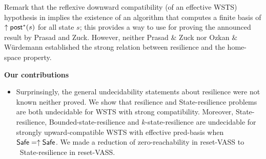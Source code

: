 Remark that the reflexive downward compatibility (of an effective WSTS) hypothesis in  \cite{DBLP:journals/corr/PrasadZ16} implies the existence of an algorithm that computes a finite basis of $\uparrow \textsf{post}^*(s)$ for all state $s$; this provides a way to use \cite{DBLP:journals/corr/abs-2108-00889} for proving the announced result by Prasad and Zuck.
However, neither Prasad \& Zuck nor Ozkan \& Würdemann established the strong relation between resilience and the home-space property.
%






\noindent
{\bf Our contributions}
\begin{itemize}

\item Surprinsingly, the general undecidability statements about resilience were not known neither proved. We show that resilience and { State-resilience} problems are both undecidable for WSTS with strong compatibility. 
Moreover, { State-resilience},
{ Bounded-state-resilience} and
{ $k$-state-resilience}
are undecidable for strongly upward-compatible WSTS with effective pred-basis
when
$\textsf{Safe}=\uparrow \textsf{Safe}$. We made a reduction of zero-reachability in reset-VASS to {\ State-resilience} in reset-VASS.



\end{itemize}
